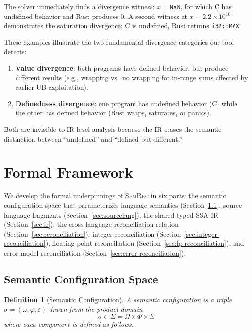 \documentclass[11pt]{article}
\newtheorem{definition}[theorem]{Definition}
\newcommand{\SemConfig}{\sigma}
\begin{document}
The solver immediately finds a divergence witness: $x = \texttt{NaN}$, for which C has undefined behavior and Rust produces 0. A second witness at $x = 2.2 \times 10^{10}$ demonstrates the saturation divergence: C is undefined, Rust returns \texttt{i32::MAX}.

These examples illustrate the two fundamental divergence categories our tool detects:
\begin{enumerate}
  \item \textbf{Value divergence}: both programs have defined behavior, but produce different results (e.g., wrapping vs.\ no wrapping for in-range sums affected by earlier UB exploitation).
  \item \textbf{Definedness divergence}: one program has undefined behavior (C) while the other has defined behavior (Rust wraps, saturates, or panics).
\end{enumerate}

Both are invisible to IR-level analysis because the IR erases the semantic distinction between ``undefined'' and ``defined-but-different.''


\section{Formal Framework}
\label{sec:formal}

We develop the formal underpinnings of \textsc{SemRec} in six parts: the semantic configuration space that parameterizes language semantics (Section~\ref{sec:semconfig}), source language fragments (Section~\ref{sec:sourcelang}), the shared typed SSA IR (Section~\ref{sec:ir}), the cross-language reconciliation relation (Section~\ref{sec:reconciliation}), integer reconciliation (Section~\ref{sec:integer-reconciliation}), floating-point reconciliation (Section~\ref{sec:fp-reconciliation}), and error model reconciliation (Section~\ref{sec:error-reconciliation}).

\subsection{Semantic Configuration Space}
\label{sec:semconfig}

\begin{definition}[Semantic Configuration]
\label{def:semconfig}
A \emph{semantic configuration} is a triple $\SemConfig = (\omega, \varphi, \varepsilon)$ drawn from the product domain
\[
  \SemConfig \in \Sigma = \Omega \times \Phi \times E
\]
where each component is defined as follows.
\end{definition}
\end{document}
